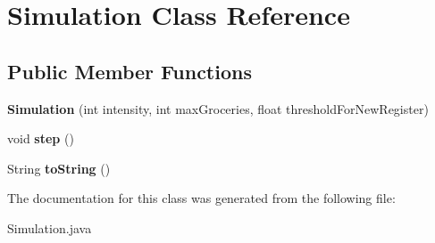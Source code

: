 \hypertarget{class_simulation}{}\section{Simulation Class Reference}
\label{class_simulation}
\subsection*{Public Member Functions}
\begin{DoxyCompactItemize}
\item 
\hypertarget{class_simulation_adb36ccbd6183bba4f8832fcaf592e774}{}{\bfseries Simulation} (int intensity, int max\+Groceries, float threshold\+For\+New\+Register)\label{class_simulation_adb36ccbd6183bba4f8832fcaf592e774}

\item 
\hypertarget{class_simulation_a191a1c3bdd167494288a49206657090c}{}void {\bfseries step} ()\label{class_simulation_a191a1c3bdd167494288a49206657090c}

\item 
\hypertarget{class_simulation_a62bc9c7d0357063026acf3682b362552}{}String {\bfseries to\+String} ()\label{class_simulation_a62bc9c7d0357063026acf3682b362552}

\end{DoxyCompactItemize}


The documentation for this class was generated from the following file\+:\begin{DoxyCompactItemize}
\item 
Simulation.\+java\end{DoxyCompactItemize}
